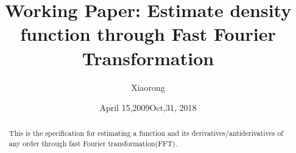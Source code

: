 \documentclass[numreferences]{kluwer}    %
\begin{document}
\begin{article}
\begin{opening}
\date{April 15,2009}
\title{Working Paper: Estimate density function through Fast Fourier Transformation}
\author{Xiaorong }

\date{Oct,31, 2018}
 
\begin{abstract}
This is the specification for estimating a function and its derivatives/antiderivatives of any order through fast Fourier transformation(FFT).
\end{abstract}
\end{opening}

\end{article}
\end{document}
